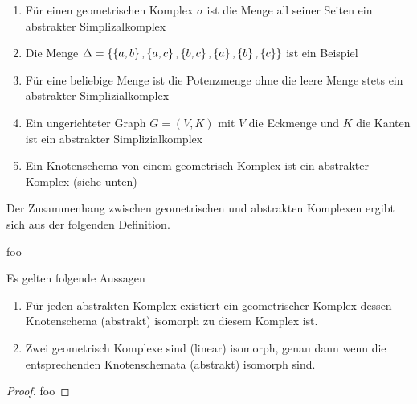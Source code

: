 \begin{Bsp}
  \begin{enumerate}[\textbullet]
  \item Für einen geometrischen Komplex $\sigma$ ist die Menge all
    seiner Seiten ein abstrakter Simplizalkomplex
  \item Die Menge $\Delta = \sset{%
      \sset{a,b},\sset{a,c},%
      \sset{b,c},\sset{a},\sset{b},\sset{c}}$ ist ein Beispiel
  \item Für eine beliebige Menge ist die Potenzmenge ohne die leere
    Menge stets ein abstrakter Simplizialkomplex
  \item Ein ungerichteter Graph $G=(V,K)$ mit $V$ die Eckmenge und $K$
    die Kanten ist ein abstrakter Simplizialkomplex
  \item Ein Knotenschema von einem geometrisch Komplex ist ein
    abstrakter Komplex (siehe unten)
  \end{enumerate}
\end{Bsp}


Der Zusammenhang zwischen geometrischen und abstrakten Komplexen ergibt sich 
aus der folgenden Definition.

\begin{Def}[Knotenschema]
\end{Def}

\begin{Bsp}
  foo
\end{Bsp}

\begin{Satz}
  Es gelten folgende Aussagen
  \begin{enumerate}[(1)]
  \item Für jeden abstrakten Komplex existiert ein geometrischer
    Komplex dessen Knotenschema (abstrakt) isomorph zu diesem Komplex
    ist.
  \item Zwei geometrisch Komplexe sind (linear) isomorph, genau dann
    wenn die entsprechenden Knotenschemata (abstrakt) isomorph sind.
  \end{enumerate}
  \begin{proof}
    foo
  \end{proof}
\end{Satz}


